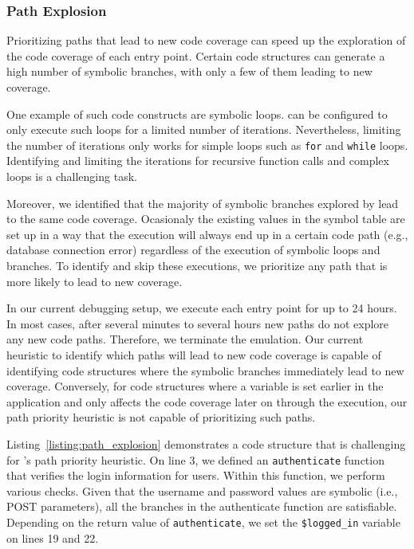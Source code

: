 \subsubsection{Path Explosion}
Prioritizing paths that lead to new code coverage can speed up the exploration of the code coverage of each entry point. 
Certain code structures can generate a high number of symbolic branches, with only a few of them leading to new coverage. 

One example of such code constructs are symbolic loops. 
\animatedead{} can be configured to only execute such loops for a limited number of iterations. 
Nevertheless, limiting the number of iterations only works for simple loops such as \texttt{for} and \texttt{while} loops. 
Identifying and limiting the iterations for recursive function calls and complex loops is a challenging task. 

Moreover, we identified that the majority of symbolic branches explored by \animatedead{} lead to the same code coverage. 
Ocasionaly the existing values in the symbol table are set up in a way that the execution will always end up in a certain code path (e.g., database connection error) regardless of the execution of symbolic loops and branches. 
To identify and skip these executions, we prioritize any path that is more likely to lead to new coverage. 

In our current debugging setup, we execute each entry point for up to 24 hours. 
In most cases, after several minutes to several hours new paths do not explore any new code paths. 
Therefore, we terminate the emulation. 
Our current heuristic to identify which paths will lead to new code coverage is capable of identifying code structures where the symbolic branches immediately lead to new coverage. 
Conversely, for code structures where a variable is set earlier in the application and only affects the code coverage later on through the execution, our path priority heuristic is not capable of prioritizing such paths. 

Listing~\ref{listing:path_explosion} demonstrates a code structure that is challenging for \animatedead{}'s path priority heuristic. 
On line 3, we defined an \texttt{authenticate} function that verifies the login information for users. 
Within this function, we perform various checks. 
Given that the username and password values are symbolic (i.e., POST parameters), all the branches in the authenticate function are satisfiable. 
Depending on the return value of \texttt{authenticate}, we set the \texttt{\$logged\_in} variable on lines 19 and 22. 

